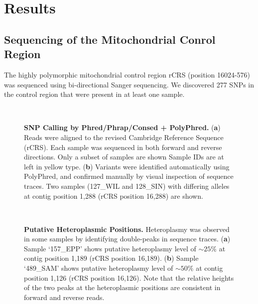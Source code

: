 \section{Results}\label{var.results}

\subsection{Sequencing of the Mitochondrial Conrol Region}

The highly polymorphic mitochondrial control region rCRS (position 16024-576) was sequenced using bi-directional Sanger sequencing.  We discovered 277 SNPs in the control region that were present in at least one sample.

\begin{figure}
  \begin{center}
    \\
      \end{center}
  \caption[Screenshots for Variant Discovery with Phred/Phrap/Consed]{
    \small{\textbf{SNP Calling by Phred/Phrap/Consed + PolyPhred.} (\textbf{a}) Reads were aligned to the revised Cambridge Reference Sequence (\ac{rCRS}).  Each sample was sequenced in both forward and reverse directions. Only a subset of samples are shown Sample IDs are at left in yellow type.  (\textbf{b}) Variants were identified automatically using PolyPhred, and confirmed manually by visual inspection of sequence traces. Two samples (127\_WIL and 128\_SIN) with differing alleles at contig position 1,288 (rCRS position 16,288) are shown.}}
  \label{var.fig.consed}
\end{figure}

\begin{figure}[htpb]
  \begin{center}
    \\
      \end{center}
  \caption[Putative Heteroplasmic Positions]{
    \small{\textbf{Putative Heteroplasmic Positions.} Heteroplasmy was observed in some samples by identifying double-peaks in sequence traces. (\textbf{a}) Sample `157\_EPP' shows putative heteroplasmy level of $\sim 25\%$ at contig position 1,189 (rCRS position 16,189). (\textbf{b}) Sample `489\_SAM' shows putative heteroplasmy level of $\sim 50\%$ at contig position 1,126 (rCRS position 16,126).} Note that the relative heights of the two peaks at the heteroplasmic positions are consistent in forward and reverse reads.}
  \label{var.fig.heteroplasmy}
\end{figure}

